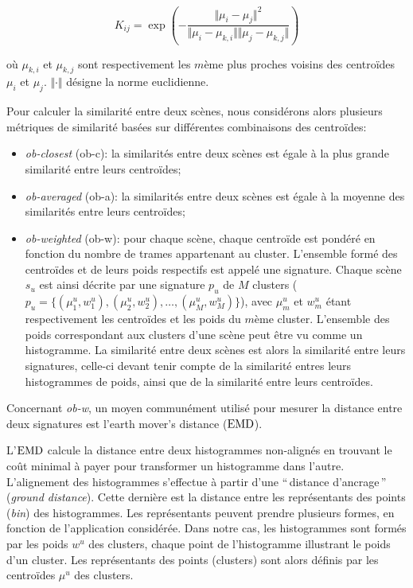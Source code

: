 \begin{equation}
\label{eq:kc}
K_{ij} = \exp\left( - \dfrac{\Vert \mu_i - \mu_j \Vert^2}{\Vert \mu_i - \mu_{k,i} \Vert \Vert \mu_j - \mu_{k,j} \Vert} \right) 
\end{equation} 

où $\mu_{k,i}$ et $\mu_{k,j}$ sont respectivement les $m$ème plus proches voisins des centroïdes $\mu_i$ et $\mu_j$. $\Vert \cdot \Vert$ désigne la norme euclidienne.

Pour calculer la similarité entre deux scènes, nous considérons alors plusieurs métriques de similarité basées sur différentes combinaisons des centroïdes:

\begin{itemize}
\item \emph{ob-closest} (ob-c): la similarités entre deux scènes est égale à la plus grande similarité entre leurs centroïdes;
\item \emph{ob-averaged} (ob-a): la similarités entre deux scènes est égale à la moyenne des similarités entre leurs centroïdes;
\item \emph{ob-weighted} (ob-w): pour chaque scène, chaque centroïde est pondéré en fonction du nombre de trames appartenant au cluster. L'ensemble formé des centroïdes et de leurs poids respectifs est appelé une signature. Chaque scène $s_u$ est ainsi décrite par une signature $p_u$ de $M$ clusters ($p_u=\lbrace(\mu_1^u,w_1^u),(\mu_2^u,w_2^u),\ldots,(\mu_M^u,w_M^u)\rbrace$), avec $\mu_m^u$ et $w_m^u$ étant respectivement les centroïdes et les poids du $m$ème cluster. L'ensemble des poids correspondant aux clusters d'une scène peut être vu comme un histogramme. La similarité entre deux scènes est alors la similarité entre leurs signatures, celle-ci devant tenir compte de la similarité entres leurs histogrammes de poids, ainsi que de la similarité entre leurs centroïdes.
\end{itemize}

Concernant \emph{ob-w}, un moyen communément utilisé pour mesurer la distance entre deux signatures est l'earth mover's distance ($\mathrm{EMD}$). 

L'$\mathrm{EMD}$ calcule la distance entre deux histogrammes non-alignés en trouvant le coût minimal à payer pour transformer un histogramme dans l'autre. L'alignement des histogrammes s'effectue à partir d'une ``\,distance d'ancrage\,'' (\emph{ground distance}). Cette dernière est la distance entre les représentants des points (\emph{bin}) des histogrammes. Les représentants peuvent prendre plusieurs formes, en fonction de l'application considérée. Dans notre cas, les histogrammes sont formés par les poids $w^u$ des clusters, chaque point de l'histogramme illustrant le poids d'un cluster. Les représentants des points (clusters) sont alors définis par les centroïdes $\mu^u$ des clusters.

